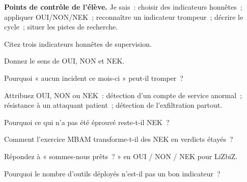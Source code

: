 \begin{boxinfo}
\textbf{Points de contrôle de l'élève.} Je sais~: choisir des indicateurs
honnêtes~; appliquer OUI/NON/NEK~; reconnaître un indicateur trompeur~;
décrire le cycle~; situer les pistes de recherche.
\end{boxinfo}

\bigskip

\begin{boxexo}[title={\ding{45}\quad Exercice~20.1. Indicateurs \niveaubase}]
Citez trois indicateurs honnêtes de supervision.
\end{boxexo}

\begin{boxexo}[title={\ding{45}\quad Exercice~20.2. Trois valeurs \niveaubase}]
Donnez le sens de OUI, NON et NEK.
\end{boxexo}

\begin{boxexo}[title={\ding{45}\quad Exercice~20.3. Trompeur \niveaubase}]
Pourquoi « aucun incident ce mois-ci » peut-il tromper~?
\end{boxexo}

\begin{boxexo}[title={\ding{45}\quad Exercice~20.4. Classer \niveaumoyen}]
Attribuez OUI, NON ou NEK~: détection d'un compte de service anormal~;
résistance à un attaquant patient~; détection de l'exfiltration partout.
\end{boxexo}

\begin{boxexo}[title={\ding{45}\quad Exercice~20.5. Pas de test \niveaumoyen}]
Pourquoi ce qui n'a pas été éprouvé reste-t-il NEK~?
\end{boxexo}

\begin{boxexo}[title={\ding{45}\quad Exercice~20.6. MBAM \niveaumoyen}]
Comment l'exercice MBAM transforme-t-il des NEK en verdicts étayés~?
\end{boxexo}

\begin{boxexo}[title={\ding{45}\quad Exercice~20.7. Note au DG \niveaumoyen}]
Répondez à « sommes-nous prêts~? » en OUI / NON / NEK pour LiZbiZ.
\end{boxexo}

\begin{boxexo}[title={\ding{45}\quad Exercice~20.8. Outils \niveaumoyen}]
Pourquoi le nombre d'outils déployés n'est-il pas un bon indicateur~?
\end{boxexo}

